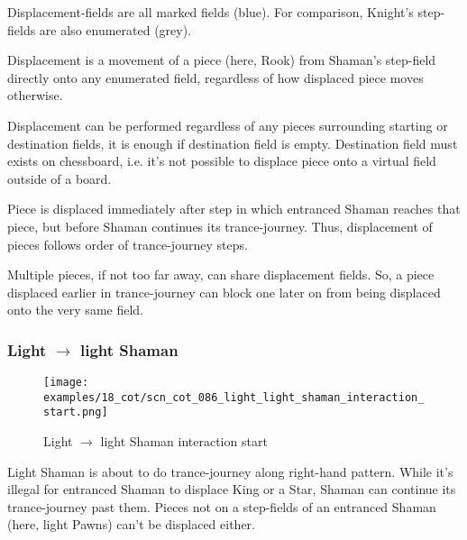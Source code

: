 Displacement-fields are all marked fields (blue). For comparison, Knight's
step-fields are also enumerated (grey).

Displacement is a movement of a piece (here, Rook) from Shaman's step-field directly
onto any enumerated field, regardless of how displaced piece moves otherwise.

Displacement can be performed regardless of any pieces surrounding starting or
destination fields, it is enough if destination field is empty. Destination field
must exists on chessboard, i.e. it's not possible to displace piece onto a virtual
field outside of a board.

Piece is displaced immediately after step in which entranced Shaman reaches that
piece, but before Shaman continues its trance-journey. Thus, displacement of pieces
follows order of trance-journey steps.

Multiple pieces, if not too far away, can share displacement fields. So, a piece
displaced earlier in trance-journey can block one later on from being displaced
onto the very same field.

\clearpage %

\subsubsection*{Light $\rightarrow$ light Shaman}
\label{sec:Conquest of Tlalocan/Trance-journey/Interactions/Light --> light Shaman}

\vspace*{-1.2\baselineskip}
\noindent
\begin{figure}[!h]
\texttt{[image: examples/18\_cot/scn\_cot\_086\_light\_light\_shaman\_interaction\_start.png]}
\caption{Light $\rightarrow$ light Shaman interaction start}
\label{fig:scn_cot_086_light_light_shaman_interaction_start}
\end{figure}

Light Shaman is about to do trance-journey along right-hand pattern. While it's
illegal for entranced Shaman to displace King or a Star, Shaman can continue its
trance-journey past them. Pieces not on a step-fields of an entranced Shaman (here,
light Pawns) can't be displaced either.

